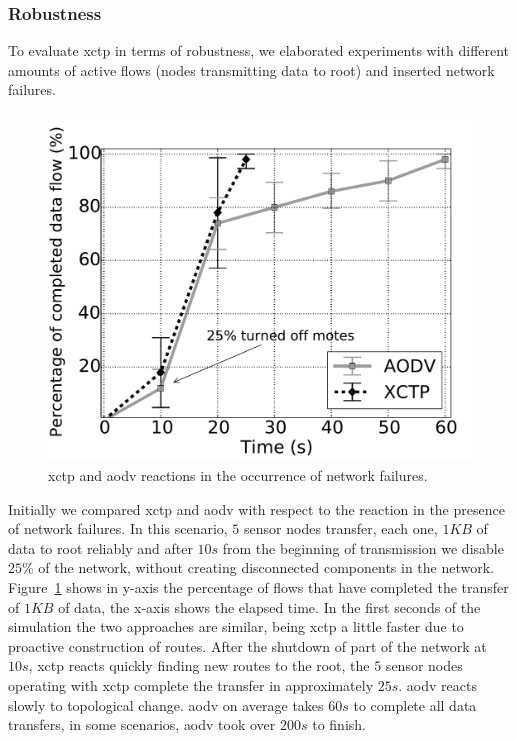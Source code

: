 \subsubsection{Robustness}
\label{sec:robustness}

To evaluate \ac{xctp} in terms of robustness, we elaborated experiments with different amounts of active flows (nodes transmitting data to root) and inserted network failures.

\begin{figure}[ht]
\centerline{
    \includegraphics[width=0.55\linewidth]{img/reacao-xctp-vs-aodv-line2}
} \caption{\ac{xctp} and \ac{aodv} reactions in the occurrence of network failures.} \label{fig:reaction-aodv-vs-xctp}
\end{figure}

Initially we compared \ac{xctp} and \ac{aodv} with respect to the reaction in
the presence of network failures. In this scenario, $5$ sensor nodes transfer,
each one, $1KB$ of data to root reliably and after $10s$ from the beginning of
transmission we disable $25\%$ of the network, without creating disconnected
components in the network. Figure~\ref{fig:reaction-aodv-vs-xctp} shows in
y-axis the percentage of flows that have completed the transfer of $1KB$ of
data, the x-axis shows the elapsed time. In the first seconds of the simulation
the two approaches are similar, being \ac{xctp} a little faster due to
proactive construction of routes. After the shutdown of part of the network at
$10s$, \ac{xctp} reacts quickly finding new routes to the root, the $5$ sensor
nodes operating with \ac{xctp} complete the transfer in
approximately $25s$. \ac{aodv} reacts slowly to topological
change. \ac{aodv} on average takes $60s$ to complete all data transfers, in some scenarios, \ac{aodv} took over $200s$ to finish.


